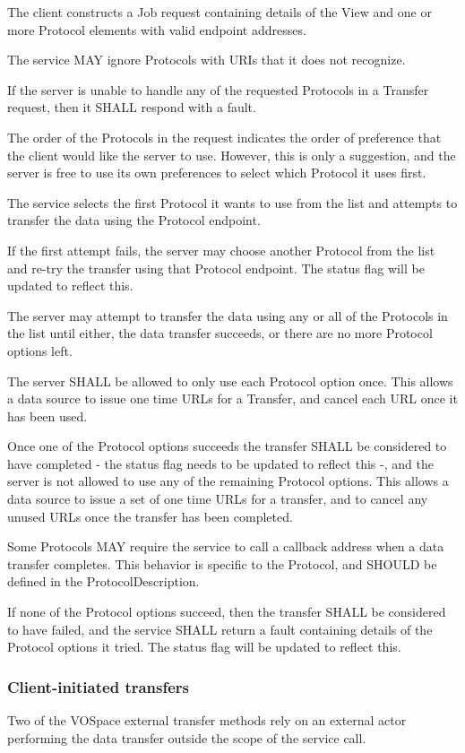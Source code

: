 \documentclass[11pt,a4paper]{ivoa}
\begin{document}
The client constructs a Job request containing details of the View and one or more Protocol elements with valid endpoint addresses.

The service MAY ignore Protocols with URIs that it does not recognize.

If the server is unable to handle any of the requested Protocols in a Transfer request, then it SHALL respond with a fault.

The order of the Protocols in the request indicates the order of preference that the client would like the server to use. However, this is only a suggestion, and the server is free to use its own preferences to select which Protocol it uses first.

The service selects the first Protocol it wants to use from the list and attempts to transfer the data using the Protocol endpoint.

If the first attempt fails, the server may choose another Protocol from the list and re-try the transfer using that Protocol endpoint. The status flag will be updated to reflect this.

The server may attempt to transfer the data using any or all of the Protocols in the list until either, the data transfer succeeds, or there are no more Protocol options left.

The server SHALL be allowed to only use each Protocol option once. This allows a data source to issue one time URLs for a Transfer, and cancel each URL once it has been used.

Once one of the Protocol options succeeds the transfer SHALL be considered to have completed - the status flag needs to be updated to reflect this -, and the server is not allowed to use any of the remaining Protocol options. This allows a data source to issue a set of one time URLs for a transfer, and to cancel any unused URLs once the transfer has been completed.

Some Protocols MAY require the service to call a callback address when a data transfer completes. This behavior is specific to the Protocol, and SHOULD be defined in the ProtocolDescription.

If none of the Protocol options succeed, then the transfer SHALL be considered to have failed, and the service SHALL return a fault containing details of the Protocol options it tried. The status flag will be updated to reflect this.

\subsubsection{Client-initiated transfers}
\label{subsubsec:client-initiated transfers}
Two of the VOSpace external transfer methods rely on an external actor performing the data transfer outside the scope of the service call.
\end{document}
